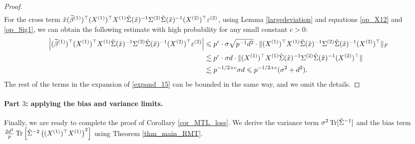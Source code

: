 \begin{proof}
\begin{align*}
\end{align*} 
For the cross term $\hat x (\widetilde \beta^{(1)})^\top (X^{(1)})^\top X^{(1)} \hat \Sigma(\hat x)^{-1}  \Sigma^{(2)} \hat \Sigma(\hat x)^{-1}  (X^{(2)})^\top  \varepsilon^{(2)}$, using Lemma \ref{largedeviation} and equations \eqref{op_X12} and \eqref{op_Sig1}, we can obtain the following estimate with high probability for any small constant $c>0$:
\begin{align*}
 \left| (\widetilde \beta^{(1)})^\top (X^{(1)})^\top X^{(1)} \hat \Sigma(\hat x)^{-1}  \Sigma^{(2)} \hat \Sigma(\hat x)^{-1}  (X^{(2)})^\top  \varepsilon^{(2)}\right|  & \leqslant p^c \cdot \sigma\sqrt{p^{-1}d^2} \cdot \|(X^{(1)})^\top X^{(1)} \hat \Sigma(\hat x)^{-1}  \Sigma^{(2)} \hat \Sigma(\hat x)^{-1}  (X^{(2)})^\top  \|_F \\
&\lesssim p^{c}\cdot \sigma d \cdot  \|(X^{(1)})^\top X^{(1)} \hat \Sigma(\hat x)^{-1}  \Sigma^{(2)} \hat \Sigma(\hat x)^{-1}  (X^{(2)})^\top  \| \\
&\lesssim p^{-1/2+c}\sigma d\leqslant p^{-1/2+c}(\sigma^2+ d^2).
\end{align*}
The rest of the terms in the expansion of \eqref{expand_15} can be bounded in the same way, and we omit the details.
 \end{proof}
  
\paragraph{Part $3$: applying the bias and variance limits.}
Finally, we are ready to complete the proof of Corollary \ref{cor_MTL_loss}.
We derive the variance term $\sigma^2  \operatorname{Tr}[\hat\Sigma^{-1}]$ and the bias term $\frac{2d^2}{p} \operatorname{Tr}\left[\hat\Sigma^{-2} \left((X^{(1)})^\top X^{(1)} \right)^2\right]$ using Theorem \ref{thm_main_RMT}.

